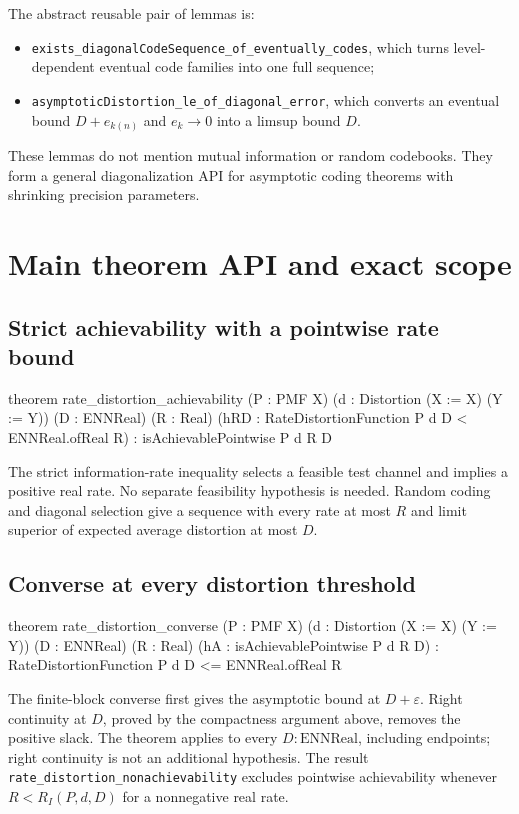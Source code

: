 \documentclass[11pt]{article}
\newcommand{\RD}{R_I}
\begin{document}
The abstract reusable pair of lemmas is:
\begin{itemize}
  \item \texttt{exists\_\allowbreak diagonal\allowbreak Code\allowbreak Sequence\_\allowbreak of\_\allowbreak eventually\_\allowbreak codes}, which
        turns level-dependent eventual code families into one full sequence;
  \item \texttt{asymptotic\allowbreak Distortion\_\allowbreak le\_\allowbreak of\_\allowbreak diagonal\_\allowbreak error}, which converts
        an eventual bound $D+e_{k(n)}$ and $e_k\to0$ into a limsup bound $D$.
\end{itemize}

These lemmas do not mention mutual information or random codebooks.  They form
a general diagonalization API for asymptotic coding theorems with shrinking
precision parameters.

\section{Main theorem API and exact scope}

\subsection{Strict achievability with a pointwise rate bound}
\begin{LeanCode}
theorem rate_distortion_achievability
    (P : PMF X) (d : Distortion (X := X) (Y := Y))
    (D : ENNReal) (R : Real)
    (hRD : RateDistortionFunction P d D < ENNReal.ofReal R) :
    isAchievablePointwise P d R D
\end{LeanCode}
The strict information-rate inequality selects a feasible test channel and
implies a positive real rate. No separate feasibility hypothesis is needed.
Random coding and diagonal selection give a sequence with every rate at most
$R$ and limit superior of expected average distortion at most $D$.

\subsection{Converse at every distortion threshold}
\begin{LeanCode}
theorem rate_distortion_converse
    (P : PMF X) (d : Distortion (X := X) (Y := Y))
    (D : ENNReal) (R : Real)
    (hA : isAchievablePointwise P d R D) :
    RateDistortionFunction P d D <= ENNReal.ofReal R
\end{LeanCode}
The finite-block converse first gives the asymptotic bound at $D+\varepsilon$.
Right continuity at $D$, proved by the compactness argument above, removes
the positive slack. The theorem applies to every $D:\mathrm{ENNReal}$,
including endpoints; right continuity is not an additional hypothesis.
The result \texttt{rate\_\allowbreak distortion\_\allowbreak nonachievability} excludes pointwise
achievability whenever $R<\RD(P,d,D)$ for a nonnegative real rate.
\end{document}
